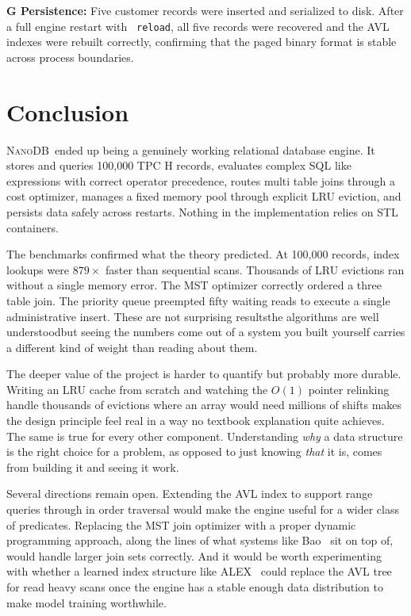 \documentclass[conference]{IEEEtran}
\newcommand{\NanoDB}{\textsc{NanoDB}}
\newcommand{\code}[1]{\texttt{#1}}
\begin{document}
\textbf{G  Persistence:} Five customer records were inserted and serialized to
disk. After a full engine restart with \code{ reload}, all five records were
recovered and the AVL indexes were rebuilt correctly, confirming that the
paged binary format is stable across process boundaries.

\section{Conclusion}

\NanoDB\ ended up being a genuinely working relational database engine. It stores
and queries 100,000 TPC H records, evaluates complex SQL like expressions with
correct operator precedence, routes multi table joins through a cost optimizer,
manages a fixed memory pool through explicit LRU eviction, and persists data
safely across restarts. Nothing in the implementation relies on STL containers.

The benchmarks confirmed what the theory predicted. At 100,000 records, index
lookups were $879\times$ faster than sequential scans. Thousands of LRU evictions
ran without a single memory error. The MST optimizer correctly ordered a
three table join. The priority queue preempted fifty waiting reads to execute a
single administrative insert. These are not surprising resultsthe algorithms
are well understoodbut seeing the numbers come out of a system you built
yourself carries a different kind of weight than reading about them.

The deeper value of the project is harder to quantify but probably more durable.
Writing an LRU cache from scratch and watching the $O(1)$ pointer relinking handle
thousands of evictions where an array would need millions of shifts makes the
design principle feel real in a way no textbook explanation quite achieves. The
same is true for every other component. Understanding \emph{why} a data structure
is the right choice for a problem, as opposed to just knowing \emph{that} it is,
comes from building it and seeing it work.

Several directions remain open. Extending the AVL index to support range queries
through in order traversal would make the engine useful for a wider class of
predicates. Replacing the MST join optimizer with a proper dynamic programming
approach, along the lines of what systems like Bao~\cite{marcus2021} sit on top
of, would handle larger join sets correctly. And it would be worth experimenting
with whether a learned index structure like ALEX~\cite{ding2020} could replace the
AVL tree for read heavy scans once the engine has a stable enough data
distribution to make model training worthwhile.

\printbibliography[title={References}]
\end{document}
